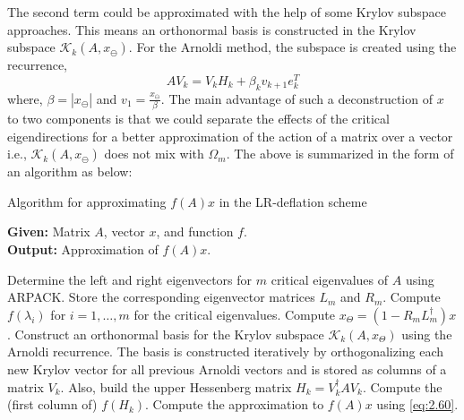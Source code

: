 The second term could be approximated with the help of some Krylov subspace approaches. This means an orthonormal basis is constructed in the Krylov subspace $\mathcal{K}_{k}(A,x_{\ominus})$. For the Arnoldi method, the subspace is created using the recurrence,
\begin{equation}
    AV_{k} = V_{k} H_{k} + \beta_{k} v_{k+1} e_{k}^{T}
    \label{eq:2.62}
\end{equation}
where, $\beta = |x_{\ominus}|$ and $v_{1} = \frac{x_{\ominus}}{\beta}$. The main advantage of such a deconstruction of $x$ to two components is that we could separate the effects of the critical eigendirections for a better approximation of the action of a matrix over a vector i.e., $\mathcal{K}_{k}(A,x_{\ominus})$ does not mix with $\Omega_{m}$. The above is summarized in the form of an algorithm as below:

\begin{algorithm}[H]
    \caption{Algorithm for approximating $f(A)x$ in the LR-deflation scheme \cite{11}}
    \label{alg:lr_deflation}
    \textbf{Given:} Matrix $A$, vector $x$, and function $f$.\\
    \textbf{Output:} Approximation of $f(A)x$.
    \begin{algorithmic}[1]
        \STATE Determine the left and right eigenvectors for $m$ critical eigenvalues of $A$ using ARPACK. Store the corresponding eigenvector matrices $L_m$ and $R_m$.
        \STATE Compute $f(\lambda_i)$ for $i = 1, \dots, m$ for the critical eigenvalues.
        \STATE Compute $x_{\Theta} = \left(1 - R_m L_m^{\dagger} \right) x$.
        \STATE Construct an orthonormal basis for the Krylov subspace $\mathcal{K}_k(A, x_\Theta)$ using the Arnoldi recurrence. The basis is constructed iteratively by orthogonalizing each new Krylov vector for all previous Arnoldi vectors and is stored as columns of a matrix $V_k$. Also, build the upper Hessenberg matrix $H_k = V_k^{\dagger} A V_k$.
        \STATE Compute the (first column of) $f(H_k)$.
        \STATE Compute the approximation to $f(A)x$ using \ref{eq:2.60}.
    \end{algorithmic}
\end{algorithm}